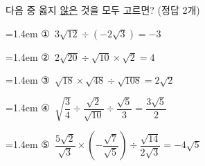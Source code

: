 다음 중 옳지 \underline{않은} 것을 모두 고르면? (정답 2개)
\par\medskip\par\noindent\hangindent=1.4em {\small ①}\ $3\sqrt{12}\div(-2\sqrt{3})=-3$\par\noindent\hangindent=1.4em {\small ②}\ $2\sqrt{20}\div\sqrt{10}\times\sqrt{2}=4$\par\noindent\hangindent=1.4em {\small ③}\ $\sqrt{18}\times\sqrt{48}\div\sqrt{108}=2\sqrt{2}$\par\noindent\hangindent=1.4em {\small ④}\ $\sqrt{\dfrac{3}{4}}\div\dfrac{\sqrt{2}}{\sqrt{10}}\div\dfrac{\sqrt{5}}{3}=\dfrac{3\sqrt{5}}{2}$\par\noindent\hangindent=1.4em {\small ⑤}\ $\dfrac{5\sqrt{2}}{\sqrt{3}}\times\left(-\dfrac{\sqrt{7}}{\sqrt{5}}\right)\div\dfrac{\sqrt{14}}{2\sqrt{3}}=-4\sqrt{5}$\par\medskip
